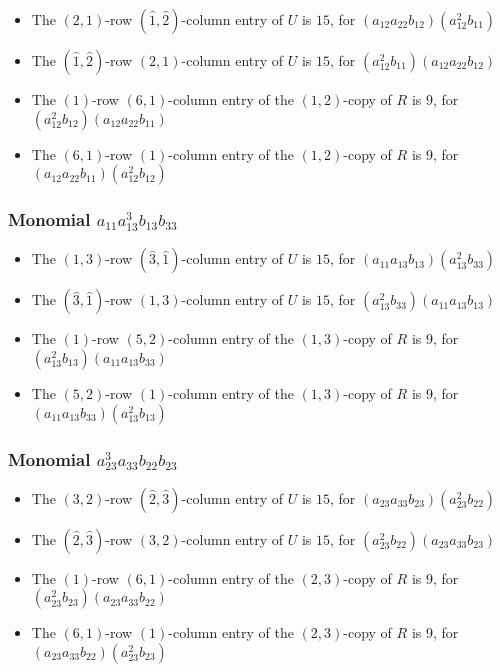 \documentclass{article}
\begin{document}
\begin{itemize}
\item The $ \left(2, 1\right) $-row $ (\hat{1}, \hat{2}) $-column entry of $U$ is $ 15 $, for $( a_{12} a_{22} b_{12} )( a_{12}^{2} b_{11} )$ 
\item The $(\hat{1}, \hat{2})$-row $ \left(2, 1\right) $-column entry of $U$ is $ 15 $, for $( a_{12}^{2} b_{11} )( a_{12} a_{22} b_{12} )$ 
\item The $(1)$-row $(6, 1)$-column entry of the $ \left(1, 2\right) $-copy of $R$ is $ 9 $, for $( a_{12}^{2} b_{12} )( a_{12} a_{22} b_{11} )$ 
\item The $(6, 1)$-row $(1)$-column entry of the $ \left(1, 2\right) $-copy of $R$ is $ 9 $, for $( a_{12} a_{22} b_{11} )( a_{12}^{2} b_{12} )$ 
\end{itemize}
\subsubsection{Monomial $ a_{11} a_{13}^{3} b_{13} b_{33} $}

\begin{itemize}
\item The $ \left(1, 3\right) $-row $ (\hat{3}, \hat{1}) $-column entry of $U$ is $ 15 $, for $( a_{11} a_{13} b_{13} )( a_{13}^{2} b_{33} )$ 
\item The $(\hat{3}, \hat{1})$-row $ \left(1, 3\right) $-column entry of $U$ is $ 15 $, for $( a_{13}^{2} b_{33} )( a_{11} a_{13} b_{13} )$ 
\item The $(1)$-row $(5, 2)$-column entry of the $ \left(1, 3\right) $-copy of $R$ is $ 9 $, for $( a_{13}^{2} b_{13} )( a_{11} a_{13} b_{33} )$ 
\item The $(5, 2)$-row $(1)$-column entry of the $ \left(1, 3\right) $-copy of $R$ is $ 9 $, for $( a_{11} a_{13} b_{33} )( a_{13}^{2} b_{13} )$ 
\end{itemize}
\subsubsection{Monomial $ a_{23}^{3} a_{33} b_{22} b_{23} $}

\begin{itemize}
\item The $ \left(3, 2\right) $-row $ (\hat{2}, \hat{3}) $-column entry of $U$ is $ 15 $, for $( a_{23} a_{33} b_{23} )( a_{23}^{2} b_{22} )$ 
\item The $(\hat{2}, \hat{3})$-row $ \left(3, 2\right) $-column entry of $U$ is $ 15 $, for $( a_{23}^{2} b_{22} )( a_{23} a_{33} b_{23} )$ 
\item The $(1)$-row $(6, 1)$-column entry of the $ \left(2, 3\right) $-copy of $R$ is $ 9 $, for $( a_{23}^{2} b_{23} )( a_{23} a_{33} b_{22} )$ 
\item The $(6, 1)$-row $(1)$-column entry of the $ \left(2, 3\right) $-copy of $R$ is $ 9 $, for $( a_{23} a_{33} b_{22} )( a_{23}^{2} b_{23} )$ 
\end{itemize}
\end{document}
